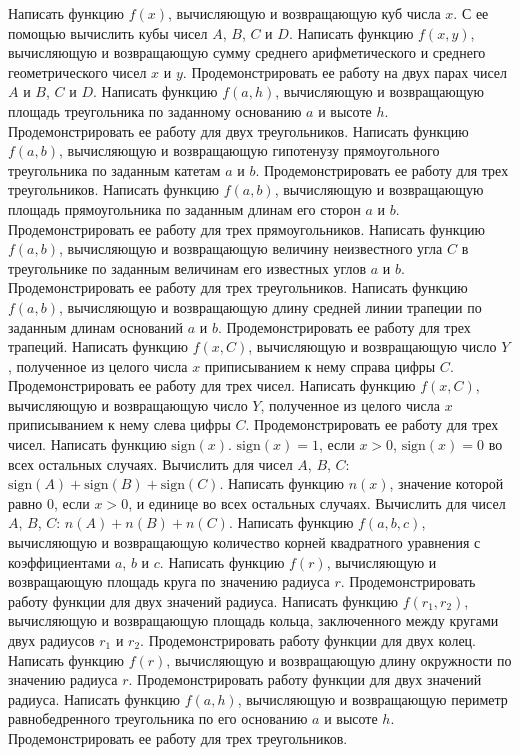 Написать функцию $f(x)$, вычисляющую и возвращающую куб числа $x$. С ее помощью вычислить кубы чисел $A$, $B$, $C$ и $D$.
Написать функцию $f(x, y)$, вычисляющую и возвращающую сумму среднего арифметического и среднего геометрического чисел $x$ и $y$. Продемонстрировать ее работу на двух парах чисел $A$ и $B$, $C$ и $D$.
Написать функцию $f(a, h)$, вычисляющую и возвращающую площадь треугольника по заданному основанию $a$ и высоте $h$. Продемонстрировать ее работу для двух треугольников.
Написать функцию $f(a, b)$, вычисляющую и возвращающую гипотенузу прямоугольного треугольника по заданным катетам $a$ и $b$. Продемонстрировать ее работу для трех треугольников.
Написать функцию $f(a, b)$, вычисляющую и возвращающую площадь прямоугольника по заданным длинам его сторон $a$ и $b$. Продемонстрировать ее работу для трех прямоугольников.
Написать функцию $f(a, b)$, вычисляющую и возвращающую величину неизвестного угла $C$ в треугольнике по заданным величинам его известных углов $a$ и $b$. Продемонстрировать ее работу для трех треугольников.
Написать функцию $f(a, b)$, вычисляющую и возвращающую длину средней линии трапеции по заданным длинам оснований $a$ и $b$. Продемонстрировать ее работу для трех трапеций.
Написать функцию $f(x, C)$, вычисляющую и возвращающую число $Y$, полученное из целого числа $x$ приписыванием к нему справа цифры $C$. Продемонстрировать ее работу для трех чисел.
Написать функцию $f(x, C)$, вычисляющую и возвращающую число $Y$, полученное из целого числа $x$ приписыванием к нему слева цифры $C$. Продемонстрировать ее работу для трех чисел.
Написать функцию $\text{sign}(x)$. $\text{sign}(x) = 1$, если $x > 0$, $\text{sign}(x) = 0$ во всех остальных случаях. Вычислить для чисел $A$, $B$, $C$: $\text{sign}(A) + \text{sign}(B) + \text{sign}(C)$.
Написать функцию $n(x)$, значение которой равно $0$, если $x > 0$, и единице во всех остальных случаях. Вычислить для чисел $A$, $B$, $C$: $n(A) + n(B) + n(C)$.
Написать функцию $f(a, b, c)$, вычисляющую и возвращающую количество корней квадратного уравнения с коэффициентами $a$, $b$ и $c$.
Написать функцию $f(r)$, вычисляющую и возвращающую площадь круга по значению радиуса $r$. Продемонстрировать работу функции для двух значений радиуса.
Написать функцию $f(r_1, r_2)$, вычисляющую и возвращающую площадь кольца, заключенного между кругами двух радиусов $r_1$ и $r_2$. Продемонстрировать работу функции для двух колец.
Написать функцию $f(r)$, вычисляющую и возвращающую длину окружности по значению радиуса $r$. Продемонстрировать работу функции для двух значений радиуса.
Написать функцию $f(a, h)$, вычисляющую и возвращающую периметр равнобедренного треугольника по его основанию $a$ и высоте $h$. Продемонстрировать ее работу для трех треугольников.
